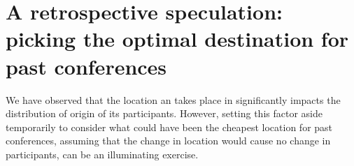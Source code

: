








\section{A retrospective speculation: picking the optimal destination for past conferences}
\label{sec:speculate}

We have observed that the location an \event takes place in significantly
impacts the distribution of origin of its participants. However, setting
this factor aside temporarily to consider what could have been the cheapest
location for past conferences, assuming that the change in location would
cause no change in participants, can be an illuminating exercise.

